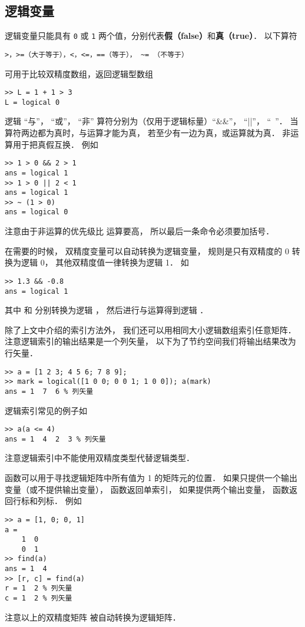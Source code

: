 \subsection{逻辑变量}

逻辑变量只能具有 \lstinline|0| 或 \lstinline|1| 两个值，分别代表\textbf{假（false）}和\textbf{真（true）}． 以下算符
\begin{lstlisting}[language=MatlabCom]
>，>=（大于等于），<，<=，==（等于）， ~= （不等于）
\end{lstlisting}
可用于比较双精度数组，返回逻辑型数组
\begin{lstlisting}[language=MatlabCom]
>> L = 1 + 1 > 3
L = logical 0
\end{lstlisting}

逻辑 “与”， “或”， “非” 算符分别为（仅用于逻辑标量）“&&”， “||”， “~”． 当算符两边都为真时，与运算才能为真， 若至少有一边为真，或运算就为真． 非运算用于把真假互换． 例如
\begin{lstlisting}[language=MatlabCom]
>> 1 > 0 && 2 > 1
ans = logical 1
>> 1 > 0 || 2 < 1
ans = logical 1
>> ~ (1 > 0)
ans = logical 0
\end{lstlisting}
注意由于非运算的优先级比 \x{>} 运算要高， 所以最后一条命令必须要加括号．

在需要的时候， 双精度变量可以自动转换为逻辑变量， 规则是只有双精度的 0 转换为逻辑 0， 其他双精度值一律转换为逻辑 1． 如
\begin{lstlisting}[language=MatlabCom]
>> 1.3 && -0.8
ans = logical 1
\end{lstlisting}
其中  和  分别转换为逻辑 ， 然后进行与运算得到逻辑 ．

除了上文中介绍的索引方法外， 我们还可以用相同大小逻辑数组索引任意矩阵． 注意逻辑索引的输出结果是一个列矢量， 以下为了节约空间我们将输出结果改为行矢量．
\begin{lstlisting}[language=MatlabCom]
>> a = [1 2 3; 4 5 6; 7 8 9];
>> mark = logical([1 0 0; 0 0 1; 1 0 0]); a(mark)
ans = 1  7  6 % 列矢量
\end{lstlisting}
逻辑索引常见的例子如
\begin{lstlisting}[language=MatlabCom]
>> a(a <= 4)
ans = 1  4  2  3 % 列矢量
\end{lstlisting}
注意逻辑索引中不能使用双精度类型代替逻辑类型．

 函数可以用于寻找逻辑矩阵中所有值为 1 的矩阵元的位置． 如果只提供一个输出变量（或不提供输出变量）， 函数返回单索引， 如果提供两个输出变量， 函数返回行标和列标． 例如
\begin{lstlisting}[language=MatlabCom]
>> a = [1, 0; 0, 1]
a =
    1  0
    0  1
>> find(a)
ans = 1  4
>> [r, c] = find(a)
r = 1  2 % 列矢量
c = 1  2 % 列矢量
\end{lstlisting}
注意以上的双精度矩阵  被自动转换为逻辑矩阵． 

